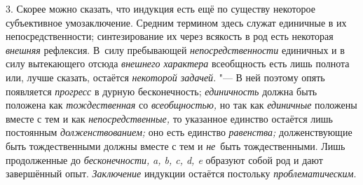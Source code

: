 3. Скорее можно сказать, что индукция есть ещё по существу
некоторое субъективное умозаключение. Средним термином здесь служат
единичные в их непосредственности; синтезирование их через всякость в род
есть некоторая {\em внешняя}
рефлексия. В~силу пребывающей
{\em непосредственности}
единичных и в силу вытекающего отсюда
{\em внешнего характера}
всеобщность есть лишь полнота или, лучше
сказать, остаётся {\em некоторой
задачей}. "--- В ней поэтому опять появляется
{\em прогресс} в дурную
бесконечность; {\em единичность}
должна быть положена как
{\em тождественная} со
{\em всеобщностью,} но
так как {\em единичные}
положены вместе с тем и как
{\em непосредственные,}
то указанное единство остаётся лишь постоянным
{\em долженствованием;}
оно есть единство
{\em равенства;}
долженствующие быть тождественными должны вместе с тем и
{\em не}~быть
тождественными. Лишь продолженные до
{\em бесконечности,}
{\em a, b, c, d, e} образуют собой род и
дают завершённый опыт. {\em Заключение}
индукции остаётся постольку
{\em проблематическим}.

